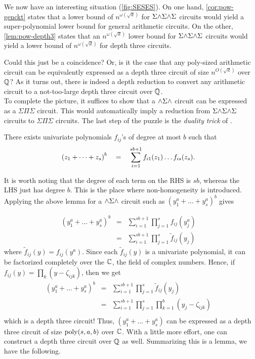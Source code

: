 We now have an interesting situation (\autoref{fig:SESES}).
On one hand, \autoref{cor:pow-genckt} states that a lower bound of
$n^{\omega(\sqrt{d})}$ for $\Sigma\mathord{\wedge}\Sigma\mathord{\wedge}\Sigma$ circuits would yield a
super-polynomial lower bound for general arithmetic circuits.
On the other, \autoref{lem:pow-depth3} states that an
$n^{\omega(\sqrt{d})}$ lower bound for $\Sigma\mathord{\wedge}\Sigma\mathord{\wedge}\Sigma$ circuits would yield a
lower bound of $n^{\omega(\sqrt{d})}$ for depth three circuits. 

Could this just be a coincidence? 
Or, is it the case that any
poly-sized arithmetic circuit can be equivalently expressed as a depth
three circuit of size $n^{O(\sqrt{d})}$ over $\mathbb{Q}$? 
As it turns out,
there is indeed a depth reduction to convert any arithmetic circuit to
a not-too-large depth three circuit over $\mathbb{Q}$. \\

To complete the picture, it suffices to show that a
$\mathord{\wedge}\Sigma\mathord{\wedge}$ circuit can be expressed as a
$\Sigma\Pi\Sigma$ circuit.
This would automatically imply a reduction from $\Sigma\mathord{\wedge}\Sigma\mathord{\wedge}\Sigma$ circuits to
$\Sigma\Pi\Sigma$ circuits.
The last step of the puzzle is the \emph{duality trick} of
\cite{sax08}. 

\begin{lemma}\label{lem:duality} There exists univariate polynomials $f_{ij}$'s of degree at most $b$ such that
$$
\left(z_1 + \dots + z_s\right)^b \quad = \quad \sum_{i=1}^{sb+1}
f_{i1}(z_1)\dots f_{is}(z_s).
$$
\end{lemma}

It is worth noting that the degree of each term on the RHS is $sb$,
whereas the LHS just has degree $b$.
This is the place where non-homogeneity is introduced.
Applying the above lemma for a $\mathord{\wedge}\Sigma\mathord{\wedge}$ circuit such
as $(y_1^a + \dots + y_s^a)^b$ gives

\begin{eqnarray*}
  (y_1^a + \dots + y_s^a)^b & = & \sum_{i=1}^{sb+1} \prod_{j=1}^s f_{ij}(y_j^a)\\
  & = & \sum_{i=1}^{sb+1} \prod_{j=1}^s \tilde{f}_{ij}(y_j)
\end{eqnarray*}
where $\tilde{f}_{ij}(y) = f_{ij}(y^a)$.
Since each $\tilde{f}_{ij}(y)$ is a univariate polynomial, it can be
factorized completely over the $\mathbb{C}$, the field of complex numbers.
Hence, if $f_{ij}(y) = \prod_k (y - \zeta_{ijk})$, then we get
\begin{eqnarray*}
  (y_1^a + \dots + y_s^a)^b & = & \sum_{i=1}^{sb+1} \prod_{j=1}^s \tilde{f}_{ij}(y_j)\\
  &= & \sum_{i=1}^{sb+1} \prod_{j=1}^s \prod_{k=1}^b (y_j - \zeta_{ijk})\\
\end{eqnarray*}
which is a depth three circuit! 
Thus, $(y_1^a + \dots + y_s^a)$ can be
expressed as a depth three circuit of size $\mathrm{poly}(s,a,b)$ over $\mathbb{C}$.
With a little more effort, one can construct a depth three circuit
over $\mathbb{Q}$ as well.
Summarizing this is a lemma, we have the following. 

